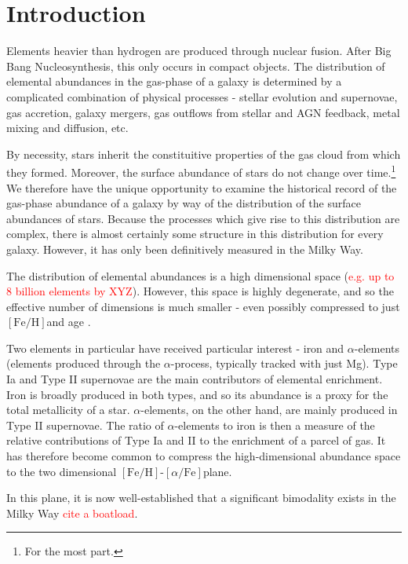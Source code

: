 \documentclass[linenumbers, twocolumn]{aastex631}
\newcommand{\FeH}{\ensuremath{[\textrm{Fe}/\textrm{H}]}}
\newcommand{\alphaFe}{\ensuremath{[\alpha/\textrm{Fe}]}}
\newcommand{\red}[1]{\textcolor{red}{#1}}
\begin{document}
\section{Introduction} \label{sec:intro}
Elements heavier than hydrogen are produced through nuclear fusion. After Big Bang Nucleosynthesis, this only occurs in compact objects. The distribution of elemental abundances in the gas-phase of a galaxy is determined by a complicated combination of physical processes - stellar evolution and supernovae, gas accretion, galaxy mergers, gas outflows from stellar and AGN feedback, metal mixing and diffusion, etc.

By necessity, stars inherit the constituitive properties of the gas cloud from which they formed. Moreover, the surface abundance of stars do not change over time.\footnote{For the most part.} We therefore have the unique opportunity to examine the historical record of the gas-phase abundance of a galaxy by way of the distribution of the surface abundances of stars. Because the processes which give rise to this distribution are complex, there is almost certainly some structure in this distribution for every galaxy. However, it has only been definitively measured in the Milky Way.

The distribution of elemental abundances is a high dimensional space (\red{e.g. up to 8 billion elements by XYZ}). However, this space is highly degenerate, and so the effective number of dimensions is much smaller - even possibly compressed to just \FeH and age \citep{2019ApJ...883..177N}.

Two elements in particular have received particular interest - iron and $\alpha$-elements (elements produced through the $\alpha$-process, typically tracked with just Mg). Type Ia and Type II supernovae are the main contributors of elemental enrichment. Iron is broadly produced in both types, and so its abundance is a proxy for the total metallicity of a star. $\alpha$-elements, on the other hand, are mainly produced in Type II supernovae. The ratio of $\alpha$-elements to iron is then a measure of the relative contributions of Type Ia and II to the enrichment of a parcel of gas. It has therefore become common to compress the high-dimensional abundance space to the two dimensional \FeH-\alphaFe plane.

In this plane, it is now well-established that a significant bimodality exists in the Milky Way \red{cite a boatload}.
\end{document}
